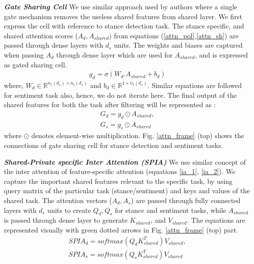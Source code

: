 \documentclass[letterpaper]{article}
\begin{document}
\par \noindent \textbf{\textit{Gate Sharing Cell}} We use similar approach used by authors \cite{wu2019different} where a single gate mechanism removes the useless shared features from shared layer. We first express the cell with reference to stance detection task. The stance specific, and shared attention scores ($A_d, A_{shared})$ from equations (\ref{attn_pol},\ref{attn_sh}) are passed through dense layers with $d_s$ units. The weights and biases are captured when passing $A_d$ through dense layer which are used for $A_{shared}$, and is expressed as gated sharing cell. %
\begin{eqnarray}
     g_d = \sigma(W_d . A_{shared}  + b_d)
    \label{eq:lstm}
\end{eqnarray}
where, $W_{d} \in \mathbb{R}^{n_{t}(d_s) \times n_{t}(d_s)} $ and $b_{d} \in \mathbb{R}^{1 \times n_{t}(d_s)} $. Similar equations are followed for sentiment task also, hence, we do not iterate here.
The final output of the shared features for both the task after filtering will be represented as :
\begin{gather}
    G_d    = g_d \odot A_{shared}, \\
    G_s    = g_s \odot A_{shared}
\end{gather}
where $\odot$ denotes element-wise multiplication. Fig. \ref{attn_frame} (top) shows the connections of gate sharing cell for stance detection and sentiment tasks.
\par \noindent \textbf{\textit{Shared-Private specific Inter Attention (SPIA)}} We use similar concept of the inter attention of feature-specific attention (equations \ref{ia_1}, \ref{ia_2}). We capture the important shared features relevant to the specific task, by using query matrix of the particular task (stance/sentiment) and keys and values of the shared task. The attention vectors ($A_d,A_s$) are passed through fully connected layers with $d_s$ units to create %
$Q_d,Q_s$ for stance and sentiment tasks, while $A_{shared}$ is passed through dense layer to generate $K_{shared}$, and $V_{shared}$. %
The equations are represented visually with green dotted arrows in Fig. \ref{attn_frame} (top) part.
\begin{gather}
    SPIA_{d} = softmax(Q_{d}K^T_{shared})V_{shared}, \\
    SPIA_{s} = softmax(Q_{s}K^T_{shared})V_{shared}
\end{gather}
\end{document}
